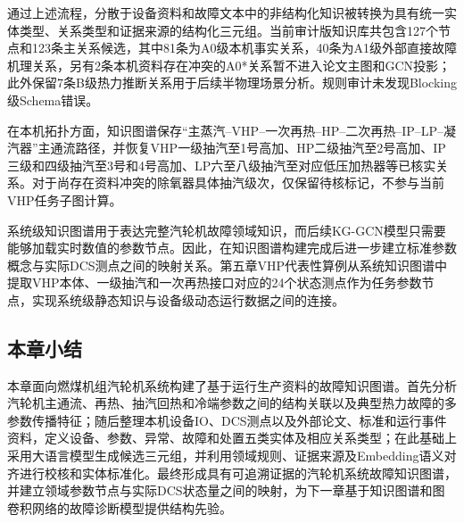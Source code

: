 通过上述流程，分散于设备资料和故障文本中的非结构化知识被转换为具有统一实体类型、关系类型和证据来源的结构化三元组。当前审计版知识库共包含127个节点和123条主关系候选，其中81条为A0级本机事实关系，40条为A1级外部直接故障机理关系，另有2条本机资料存在冲突的A0*关系暂不进入论文主图和GCN投影；此外保留7条B级热力推断关系用于后续半物理场景分析。规则审计未发现Blocking级Schema错误。

在本机拓扑方面，知识图谱保存“主蒸汽--VHP--一次再热--HP--二次再热--IP--LP--凝汽器”主通流路径，并恢复VHP一级抽汽至1号高加、HP二级抽汽至2号高加、IP三级和四级抽汽至3号和4号高加、LP六至八级抽汽至对应低压加热器等已核实关系。对于尚存在资料冲突的除氧器具体抽汽级次，仅保留待核标记，不参与当前VHP任务子图计算。

系统级知识图谱用于表达完整汽轮机故障领域知识，而后续KG-GCN模型只需要能够加载实时数值的参数节点。因此，在知识图谱构建完成后进一步建立标准参数概念与实际DCS测点之间的映射关系。第五章VHP代表性算例从系统知识图谱中提取VHP本体、一级抽汽和一次再热接口对应的24个状态测点作为任务参数节点，实现系统级静态知识与设备级动态运行数据之间的连接。


\subsection{本章小结}

本章面向燃煤机组汽轮机系统构建了基于运行生产资料的故障知识图谱。首先分析汽轮机主通流、再热、抽汽回热和冷端参数之间的结构关联以及典型热力故障的多参数传播特征；随后整理本机设备IO、DCS测点以及外部论文、标准和运行事件资料，定义设备、参数、异常、故障和处置五类实体及相应关系类型；在此基础上采用大语言模型生成候选三元组，并利用领域规则、证据来源及Embedding语义对齐进行校核和实体标准化。最终形成具有可追溯证据的汽轮机系统故障知识图谱，并建立领域参数节点与实际DCS状态量之间的映射，为下一章基于知识图谱和图卷积网络的故障诊断模型提供结构先验。
